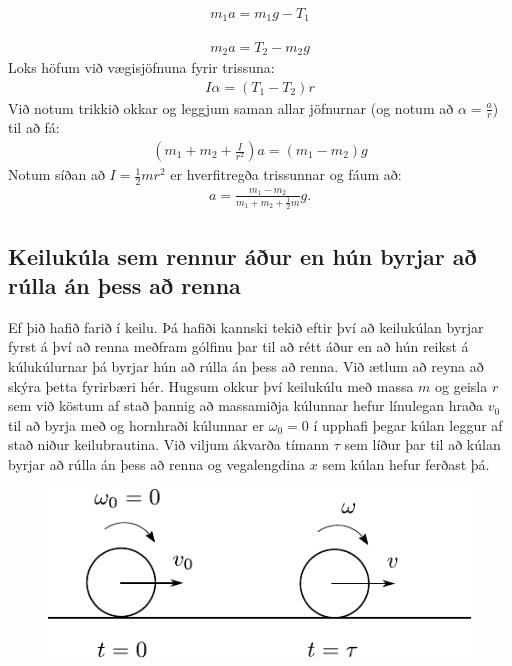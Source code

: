 \begin{align*}
    m_1 a = m_1g - T_1
\end{align*}

\begin{align*}
    m_2a = T_2 - m_2g
\end{align*}
Loks höfum við vægisjöfnuna fyrir trissuna:
\begin{align*}
    I\alpha = (T_1 - T_2)r
\end{align*}
Við notum trikkið okkar og leggjum saman allar jöfnurnar (og notum að $\alpha = \frac{a}{r}$) til að fá:
\begin{align*}
    \left(m_1 + m_2 + \frac{I}{r^2}\right)a = \left(m_1 - m_2 \right)g
\end{align*}
Notum síðan að $I = \frac{1}{2}mr^2$ er hverfitregða trissunnar og fáum að:
\begin{align*}
    a = \frac{m_1 - m_2}{m_1 + m_2 + \frac{1}{2}m}g.
\end{align*}



\subsection*{Keilukúla sem rennur áður en hún byrjar að rúlla án þess að renna}

Ef þið hafið farið í keilu. Þá hafiði kannski tekið eftir því að keilukúlan byrjar fyrst á því að renna meðfram gólfinu þar til að rétt áður en að hún reikst á kúlukúlurnar þá byrjar hún að rúlla án þess að renna. Við ætlum að reyna að skýra þetta fyrirbæri hér. Hugsum okkur því keilukúlu með massa $m$ og geisla $r$ sem við köstum af stað þannig að massamiðja kúlunnar hefur línulegan hraða $v_0$ til að byrja með og hornhraði kúlunnar er $\omega_0 = 0$ í upphafi þegar kúlan leggur af stað niður keilubrautina. Við viljum ákvarða tímann $\tau$ sem líður þar til að kúlan byrjar að rúlla án þess að renna og vegalengdina $x$ sem kúlan hefur ferðast þá. 

\begin{figure}[H]
    \centering
    \includegraphics{figures/rullaogrenna.pdf}
\end{figure}

